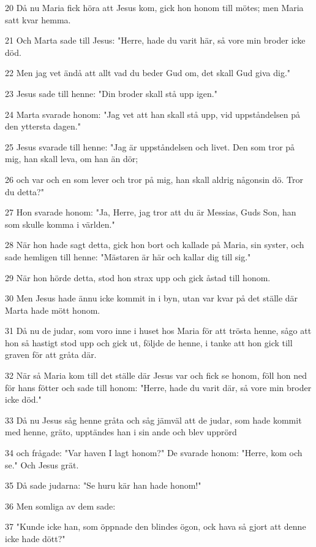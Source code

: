 \par 20 Då nu Maria fick höra att Jesus kom, gick hon honom till mötes; men Maria satt kvar hemma.
\par 21 Och Marta sade till Jesus: "Herre, hade du varit här, så vore min broder icke död.
\par 22 Men jag vet ändå att allt vad du beder Gud om, det skall Gud giva dig."
\par 23 Jesus sade till henne: "Din broder skall stå upp igen."
\par 24 Marta svarade honom: "Jag vet att han skall stå upp, vid uppståndelsen på den yttersta dagen."
\par 25 Jesus svarade till henne: "Jag är uppståndelsen och livet. Den som tror på mig, han skall leva, om han än dör;
\par 26 och var och en som lever och tror på mig, han skall aldrig någonsin dö. Tror du detta?"
\par 27 Hon svarade honom: "Ja, Herre, jag tror att du är Messias, Guds Son, han som skulle komma i världen."
\par 28 När hon hade sagt detta, gick hon bort och kallade på Maria, sin syster, och sade hemligen till henne: "Mästaren är här och kallar dig till sig."
\par 29 När hon hörde detta, stod hon strax upp och gick åstad till honom.
\par 30 Men Jesus hade ännu icke kommit in i byn, utan var kvar på det ställe där Marta hade mött honom.
\par 31 Då nu de judar, som voro inne i huset hos Maria för att trösta henne, sågo att hon så hastigt stod upp och gick ut, följde de henne, i tanke att hon gick till graven för att gråta där.
\par 32 När så Maria kom till det ställe där Jesus var och fick se honom, föll hon ned för hans fötter och sade till honom: "Herre, hade du varit där, så vore min broder icke död."
\par 33 Då nu Jesus såg henne gråta och såg jämväl att de judar, som hade kommit med henne, gräto, upptändes han i sin ande och blev upprörd
\par 34 och frågade: "Var haven I lagt honom?" De svarade honom: "Herre, kom och se." Och Jesus grät.
\par 35 Då sade judarna: "Se huru kär han hade honom!"
\par 36 Men somliga av dem sade:
\par 37 "Kunde icke han, som öppnade den blindes ögon, ock hava så gjort att denne icke hade dött?"
